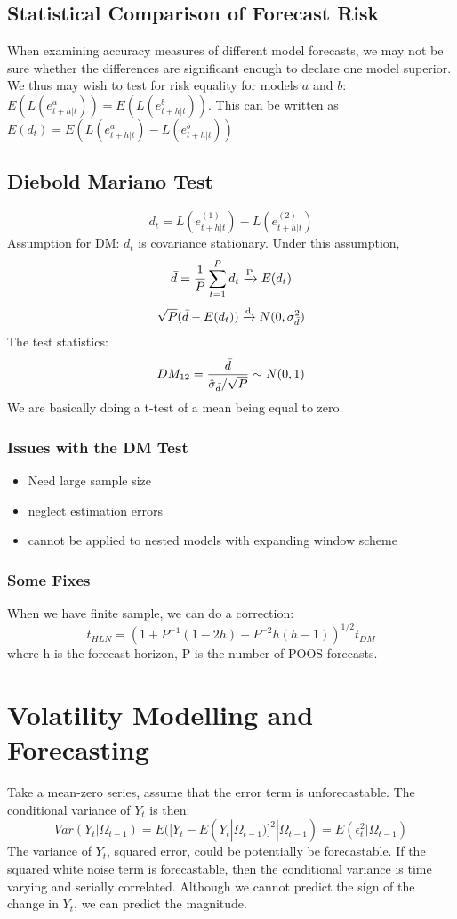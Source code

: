 \documentclass{article}
\begin{document}
\subsection{Statistical Comparison of Forecast Risk}
When examining accuracy measures of different model forecasts, we may not be sure whether the differences are significant enough to declare one model superior. We thus may wish to test for risk equality for models $a$ and $b$: $E(L(e_{t+h|t}^a)) = E(L(e_{t+h|t}^b))$. This can be written as $E(d_t) = E(L(e_{t+h|t}^a) - L(e_{t+h|t}^b))$

\subsection{Diebold Mariano Test}
$$d_t = L(e_{t+h|t}^{(1)}) - L(e_{t+h|t}^{(2)})$$
Assumption for DM: $d_t$ is covariance stationary. Under this assumption, 
$$\Bar{d} = \frac{1}{P}\sum_{t=1}^P d_t \xrightarrow{\text{P}} E(d_t)$$
$$\sqrt{P} (\Bar{d}-E(d_t)) \xrightarrow{\text{d}} N(0, \sigma_{\Bar{d}}^2)$$
The test statistics:
$$DM_{12} = \frac{\Bar{d}}{\hat{\sigma}_{\Bar{d}} / \sqrt{P}} \sim N(0,1)$$
We are basically doing a t-test of a mean being equal to zero.

\subsubsection{Issues with the DM Test}
\begin{itemize}
    \item Need large sample size
    \item neglect estimation errors
    \item cannot be applied to nested models with expanding window scheme
\end{itemize}

\subsubsection{Some Fixes}
When we have finite sample, we can do a correction:
$$t_{HLN} = (1 + P^{-1}(1-2h) + P^{-2}h(h-1))^{1/2} t_{DM}$$
where h is the forecast horizon, P is the number of POOS forecasts.


\section{Volatility Modelling and Forecasting}
Take a mean-zero series, assume that the error term is unforecastable. The conditional variance of $Y_t$ is then:
$$Var(Y_t|\Omega_{t-1}) = E([Y_t - E(Y_t|\Omega_{t-1})]^2|\Omega_{t-1}) = E(\epsilon_t^2|\Omega_{t-1})$$
The variance of $Y_t$, squared error, could be potentially be forecastable. If the squared white noise term is forecastable, then the conditional variance is time varying and serially correlated. Although we cannot predict the sign of the change in $Y_t$, we can predict the magnitude.
\end{document}
